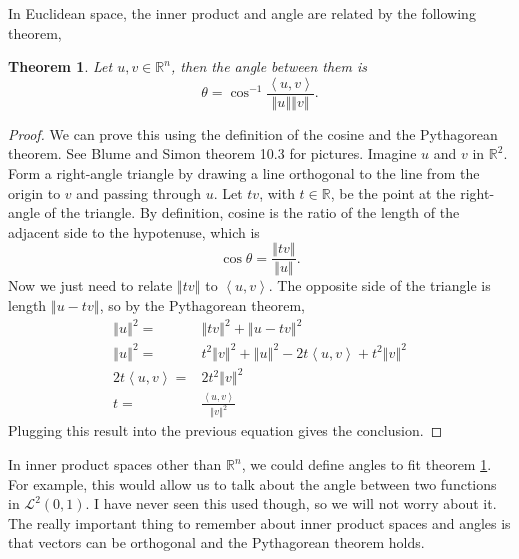 \documentclass[12pt,reqno]{amsart}
\newtheorem{theorem}{Theorem}[section]
\theoremstyle{definition}
\def\R{\mathbb{R}}
\newcommand{\iprod}[2]{\left\langle {#1} , {#2} \right\rangle}
\newcommand{\norm}[1]{\left\Vert {#1} \right\Vert}
\begin{document}
In Euclidean space, the inner product and angle are related by the
following theorem,
\begin{theorem}\label{thm:angle}
  Let $u, v \in \R^n$, then the angle between them is
  \[ \theta = \cos^{-1} \frac{\iprod{u}{v}}{\norm{u}\norm{v}}. \]  
\end{theorem}
\begin{proof}
  We can prove this using the definition of the cosine and the
  Pythagorean theorem.  See Blume and Simon theorem 10.3 for
  pictures. Imagine $u$ and $v$ in $\R^2$. Form a right-angle triangle
  by drawing a line orthogonal to the line from the origin to $v$ and
  passing through $u$. Let $t v$, with $t \in \R$, be the point at the
  right-angle of the triangle. By definition, cosine is the ratio of
  the length of the adjacent side to the hypotenuse, which is
  \[ \cos \theta = \frac{\norm{tv}}{\norm{u}}. \]
  Now we just need to relate $\norm{tv}$ to $\iprod{u}{v}$. The
  opposite side of the triangle is length $\norm{u - tv}$, so by the
  Pythagorean theorem,
  \begin{align*}
    \norm{u}^2 = & \norm{tv}^2 + \norm{u - tv}^2 \\
    \norm{u}^2 = & t^2 \norm{v}^2 + \norm{u}^2 - 2t\iprod{u}{v} + t^2
    \norm{v}^2 
    \\
    2 t \iprod{u}{v} = & 2 t^2 \norm{v}^2 \\
    t = & \frac{\iprod{u}{v}}{\norm{v}^2}
  \end{align*}
  Plugging this result into the previous equation gives the conclusion.
\end{proof}
In inner product spaces other than $\R^n$, we could define angles to
fit theorem \ref{thm:angle}. For example, this would allow us to talk
about the angle between two functions in $\mathcal{L}^2(0,1)$. I have
never seen this used though, so we will not worry about it. The really
important thing to remember about inner product spaces and angles is
that vectors can be orthogonal and the Pythagorean theorem holds. 
\end{document}
